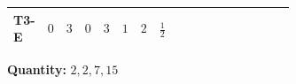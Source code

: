 \documentclass[8pt]{article}
\begin{document}
\begin{landscape}
\begin{longtable}{@{}llcccccc >{\raggedright\arraybackslash}p{0.21\linewidth} >{\raggedright\arraybackslash}p{0.21\linewidth} >{\raggedright\arraybackslash}p{0.21\linewidth}@{}}
T3-E & $0$ & $3$ & $0$ & $3$ & $1$ & $2$ & $\frac{1}{2}$ & \scriptsize\adjustbox{max width=\linewidth}{$\begin{gathered} \frac{\sqrt{3} g_{2}^{2} \overline{y_{1}} \overline{y_{2}}}{6 MF}\end{gathered}$} & \scriptsize\adjustbox{max width=\linewidth}{$\begin{gathered} - \frac{49 \sqrt{3} i g_{2}^{2} \overline{y_{1}} \overline{y_{2}}}{24 MF}\end{gathered}$} & \scriptsize\adjustbox{max width=\linewidth}{$\begin{gathered} - \frac{3 \sqrt{11} i lambda12Inv2 \overline{y_{1}} \overline{y_{2}}}{22 MF}\end{gathered}$} \\
\midrule
\bottomrule
\end{longtable}
\clearpage
\noindent\textbf{Quantity: }$\mathrm{2,2,7,15}$\par\smallskip

\end{landscape}
\end{document}
